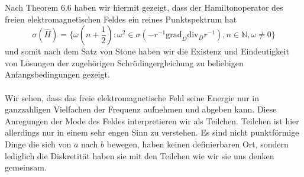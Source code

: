 \documentclass[11pt,a4paper,leqno]{report}
\numberwithin{equation}{chapter}
\begin{document}
\noindent
Nach Theorem 6.6 haben wir hiermit gezeigt, dass der Hamiltonoperator des freien elektromagnetischen Feldes ein reines Punktspektrum hat
\begin{equation}
	\sigma(\hat{H}) = \{\omega(n+\frac{1}{2}): \omega^2\in\sigma(-r^{-1}\text{grad}_D\text{div}_Dr^{-1}), n\in\mathbb{N},\omega\neq 0\}
\end{equation}
und somit nach dem Satz von Stone haben wir die Existenz und Eindeutigkeit von L\"osungen der zugeh\"origen Schr\"odingergleichung zu beliebigen Anfangsbedingungen gezeigt.
\\
\\
Wir sehen, dass das freie elektromagnetische Feld seine Energie nur in ganzzahligen Vielfachen der Frequenz aufnehmen und abgeben kann. Diese Anregungen der Mode des Feldes interpretieren wir als Teilchen. Teilchen ist hier allerdings nur in einem sehr engen Sinn zu verstehen. Es sind nicht punktf\"ormige Dinge die sich von $a$ nach $b$ bewegen, haben keinen definierbaren Ort, sondern lediglich die Diskretit\"at haben sie mit den Teilchen wie wir sie uns denken gemeinsam.
\end{document}
